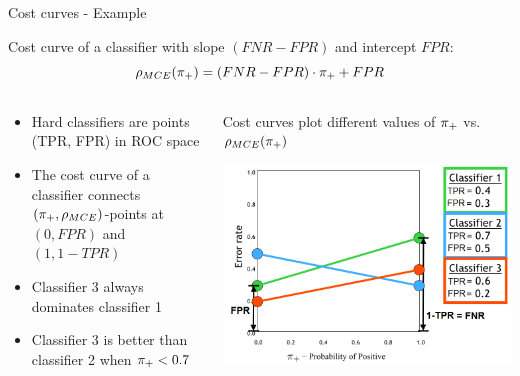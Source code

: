 


\begin{vbframe}{Cost curves - Example}


Cost curve of a classifier with slope $(FNR - FPR)$ and intercept $FPR$:
$$\rho_{MCE}(\pi_{+}) = (FNR - FPR) \cdot \pi_{+} + FPR$$

\begin{columns}[T]
\begin{column}{0.49\textwidth}

\begin{itemize}
\item Hard classifiers are points (TPR, FPR) in ROC space
\item The cost curve of a classifier connects $(\pi_{+}, \rho_{MCE})$-points at
$(0, FPR)$ and $(1, 1-TPR)$
\item Classifier 3 always dominates classifier 1
\item Classifier 3 is better than classifier 2 when $\pi_{+} < 0.7$
\end{itemize}

\end{column}

\begin{column}{0.49\textwidth}
\centering
Cost curves plot different values of $\pi_{+}$ vs. $\rho_{MCE}(\pi_{+})$

\includegraphics[width=\textwidth]{figure_man/cost-curves-3.png}
\end{column}
\end{columns}
\end{vbframe}

